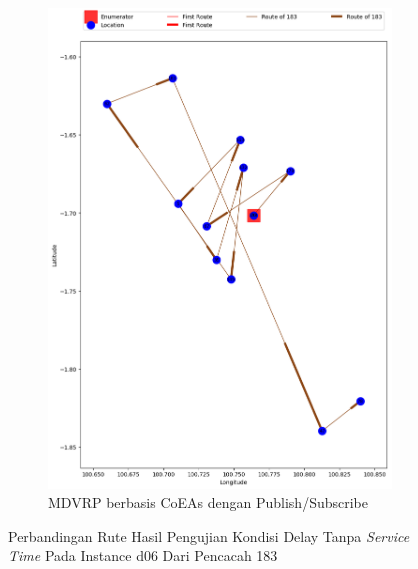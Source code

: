 \begin{figure}[H]\ContinuedFloat
	\centering
	\begin{subfigure}[t]{\textwidth}
		\centering
		\includegraphics[width=\textwidth]{Resources/Images/delayed_6/real_m15_n100_delayed_6_183_pubsub_coes}
		\caption{MDVRP berbasis CoEAs dengan Publish/Subscribe}
		\label{fig:real_m15_n100_delayed_6_183_pubsub_coes}
	\end{subfigure}
	\caption{Perbandingan Rute Hasil Pengujian Kondisi Delay Tanpa \textit{Service Time} Pada Instance d06 Dari Pencacah 183}
	\label{fig:real_m15_n100_delayed_6_183_contd}
\end{figure}


